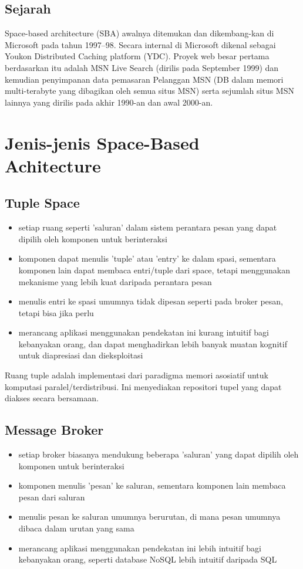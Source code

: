 \subsection{{Sejarah}}
 Space-based architecture (SBA) awalnya ditemukan dan dikembang-kan di Microsoft pada tahun 1997–98. Secara internal di Microsoft dikenal sebagai Youkon Distributed Caching platform (YDC). Proyek web besar pertama berdasarkan itu adalah MSN Live Search (dirilis pada September 1999) dan kemudian penyimpanan data pemasaran Pelanggan MSN (DB dalam memori multi-terabyte yang dibagikan oleh semua situs MSN) serta sejumlah situs MSN lainnya yang dirilis pada akhir 1990-an dan awal 2000-an.
\section{{Jenis-jenis Space-Based Achitecture}}
\subsection{{Tuple Space}}
\begin{itemize}
	\item  setiap ruang seperti 'saluran' dalam sistem perantara pesan yang dapat dipilih oleh komponen untuk berinteraksi
	\item  komponen dapat menulis 'tuple' atau 'entry' ke dalam spasi, sementara komponen lain dapat membaca entri/tuple dari space, tetapi menggunakan mekanisme yang lebih kuat daripada perantara pesan
	\item  menulis entri ke spasi umumnya tidak dipesan seperti pada broker pesan, tetapi bisa jika perlu
	\item  merancang aplikasi menggunakan pendekatan ini kurang intuitif bagi kebanyakan orang, dan dapat menghadirkan lebih banyak muatan kognitif untuk diapresiasi dan dieksploitasi
\end{itemize}
 Ruang tuple adalah implementasi dari paradigma memori asosiatif untuk komputasi paralel/terdistribusi. Ini menyediakan repositori tupel yang dapat diakses secara bersamaan.
\subsection{{Message Broker}}
\begin{itemize}
	\item  setiap broker biasanya mendukung beberapa 'saluran' yang dapat dipilih oleh komponen untuk berinteraksi
	\item  komponen menulis 'pesan' ke saluran, sementara komponen lain membaca pesan dari saluran
	\item  menulis pesan ke saluran umumnya berurutan, di mana pesan umumnya dibaca dalam urutan yang sama
	\item  merancang aplikasi menggunakan pendekatan ini lebih intuitif bagi kebanyakan orang, seperti database NoSQL lebih intuitif daripada SQL
\end{itemize}
